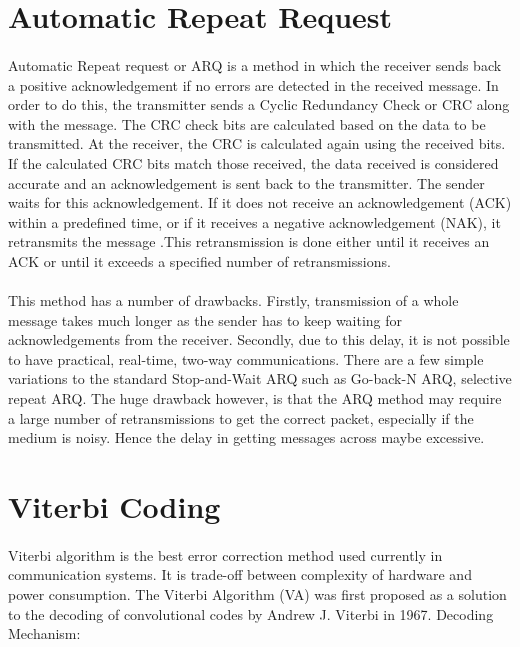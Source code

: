 \documentclass[14pt]{report}
\begin{document}
{\section{Automatic Repeat Request}
\paragraph{} Automatic Repeat request or ARQ is a method in which the receiver sends back a positive acknowledgement if no errors are detected in the received message. In order to do this, the transmitter sends a Cyclic Redundancy Check or CRC along with the message. The CRC check bits are calculated based on the data to be transmitted. At the receiver, the CRC is calculated again using the received bits. If the calculated CRC bits match those received, the data received is considered accurate and an acknowledgement is sent back to the transmitter. The sender waits for this acknowledgement. If it does not receive an acknowledgement (ACK) within a predefined time, or if it receives a negative acknowledgement (NAK), it retransmits the message .This retransmission is done either until it receives an ACK or until it exceeds a specified number of retransmissions.
\paragraph{} This method has a number of drawbacks. Firstly, transmission of a whole message takes much longer as the sender has to keep waiting for acknowledgements from the receiver. Secondly, due to this delay, it is not possible to have practical, real-time, two-way communications. There are a few simple variations to the standard Stop-and-Wait ARQ such as Go-back-N ARQ, selective repeat ARQ. The huge drawback however, is that the ARQ method may require a large number of retransmissions to get the correct packet, especially if the medium is noisy. Hence the delay in getting messages across maybe excessive. 
\section{Viterbi Coding}
\paragraph{} Viterbi algorithm is the best error correction method used currently in communication systems. It is trade-off between complexity of hardware and power consumption. The Viterbi Algorithm (VA) was first proposed as a solution to the decoding of convolutional codes by Andrew J. Viterbi in 1967.
Decoding Mechanism:
}
\end{document}
